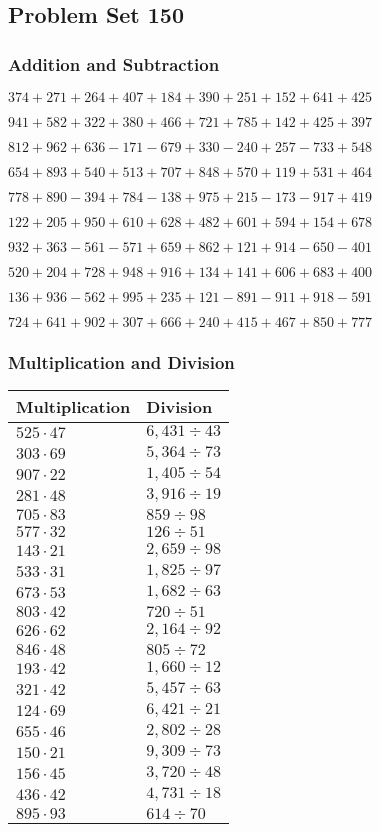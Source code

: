 \hypertarget{problem-set-150}{%
\subsection{Problem Set 150}\label{problem-set-150}}

\hypertarget{addition-and-subtraction}{%
\subsubsection{Addition and
Subtraction}\label{addition-and-subtraction}}

\(374 +271 +264 +407 +184 +390 +251 +152 +641 +425\)

\(941 +582 +322 +380 +466 +721 +785 +142 +425 +397\)

\(812 +962 +636 - 171 - 679 +330 - 240 +257 - 733 +548\)

\(654 +893 +540 +513 +707 +848 +570 +119 +531 +464\)

\(778 +890 - 394 +784 - 138 +975 +215 - 173 - 917 +419\)

\(122 +205 +950 +610 +628 +482 +601 +594 +154 +678\)

\(932 +363 - 561 - 571 +659 +862 +121 +914 - 650 - 401\)

\(520 +204 +728 +948 +916 +134 +141 +606 +683 +400\)

\(136 +936 - 562 +995 +235 +121 - 891 - 911 +918 - 591\)

\(724 +641 +902 +307 +666 +240 +415 +467 +850 +777\)

\hypertarget{multiplication-and-division}{%
\subsubsection{Multiplication and
Division}\label{multiplication-and-division}}

\begin{longtable}[]{@{}ll@{}}
\toprule
Multiplication & Division\tabularnewline
\midrule
\endhead
\(525 \cdot 47\) & \(6,431÷43\)\tabularnewline
\(303 \cdot 69\) & \(5,364÷73\)\tabularnewline
\(907 \cdot 22\) & \(1,405÷54\)\tabularnewline
\(281 \cdot 48\) & \(3,916÷19\)\tabularnewline
\(705 \cdot 83\) & \(859÷98\)\tabularnewline
\(577 \cdot 32\) & \(126÷51\)\tabularnewline
\(143 \cdot 21\) & \(2,659÷98\)\tabularnewline
\(533 \cdot 31\) & \(1,825÷97\)\tabularnewline
\(673 \cdot 53\) & \(1,682÷63\)\tabularnewline
\(803 \cdot 42\) & \(720÷51\)\tabularnewline
\(626 \cdot 62\) & \(2,164÷92\)\tabularnewline
\(846 \cdot 48\) & \(805÷72\)\tabularnewline
\(193 \cdot 42\) & \(1,660÷12\)\tabularnewline
\(321 \cdot 42\) & \(5,457÷63\)\tabularnewline
\(124 \cdot 69\) & \(6,421÷21\)\tabularnewline
\(655 \cdot 46\) & \(2,802÷28\)\tabularnewline
\(150 \cdot 21\) & \(9,309÷73\)\tabularnewline
\(156 \cdot 45\) & \(3,720÷48\)\tabularnewline
\(436 \cdot 42\) & \(4,731÷18\)\tabularnewline
\(895 \cdot 93\) & \(614÷70\)\tabularnewline
\bottomrule
\end{longtable}
